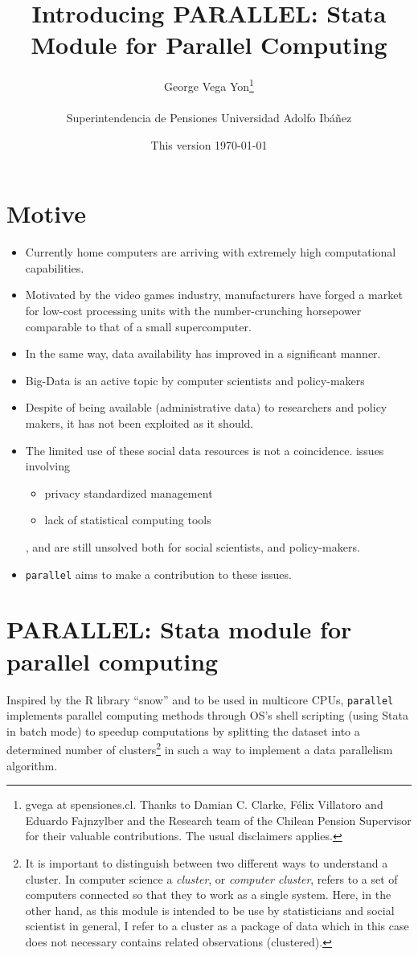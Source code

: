 \documentclass[letterpaper, 14pt, titlepage]{article}
\author{\Huge George Vega Yon\thanks{\Large gvega at spensiones.cl. Thanks to Damian C. Clarke, F\'elix Villatoro and Eduardo Fajnzylber and the Research team of the Chilean Pension Supervisor for their valuable contributions. The usual disclaimers applies.}\\\\\huge Superintendencia de Pensiones \hspace{1cm} Universidad Adolfo Ib\'a\~nez}
\title{\Huge Introducing PARALLEL: Stata Module for Parallel Computing}
\date{\Large This version \today}
\begin{document}
\begin{landscape}
\maketitle

\clearpage
\LARGE
\section{\Huge Motive}

\begin{itemize}
\item Currently home computers are arriving with extremely high computational capabilities. 
\item Motivated by the video games industry, manufacturers have forged a market for low-cost processing units with the number-crunching horsepower comparable to that of a small supercomputer.

\item In the same way, data availability has improved in a significant manner.
\item Big-Data is an active topic by computer scientists and policy-makers
\item Despite of being available (administrative data) to researchers and policy makers, it has not been exploited as it should.
\item The limited use of these social data resources is not a coincidence. issues involving
\begin{itemize}
\item privacy standardized management
\item lack of statistical computing tools
\end{itemize},  and  are still unsolved both for social scientists, and policy-makers. 
\item {\tt parallel} aims to make a contribution to these issues.
\end{itemize}

\clearpage

\Large
\section{\Huge PARALLEL: Stata module for parallel computing}

Inspired by the R library ``snow'' and to be used in multicore CPUs, {\tt parallel} implements parallel computing methods through OS's shell scripting (using Stata in batch mode) to speedup computations by splitting the dataset into a determined number of clusters\footnote{\normalsize It is important to distinguish between two different ways to understand a cluster. In computer science a \emph{cluster}, or \emph{computer cluster}, refers to a set of computers connected so that they to work as a single system. Here, in the other hand, as this module is intended to be use by statisticians and social scientist in general, I refer to a cluster as a package of data which in this case does not necessary contains related observations (clustered).} in such a way to implement a data parallelism algorithm.


\end{landscape}
\end{document}
